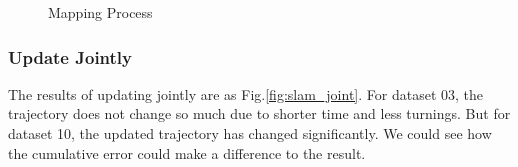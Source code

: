 \documentclass[conference]{IEEEtran}
\begin{document}
\begin{figure}[htbp]
    \centering

    \centering
    \caption{Mapping Process} \label{fig:mapping_process}
\end{figure}

\subsubsection{Update Jointly}
The results of updating jointly are as Fig.\ref{fig:slam_joint}. For dataset 03, the trajectory does not change
so much due to shorter time and less turnings. But for dataset 10, the updated trajectory has changed significantly.
We could see how the cumulative error could make a difference to the result.
\end{document}
